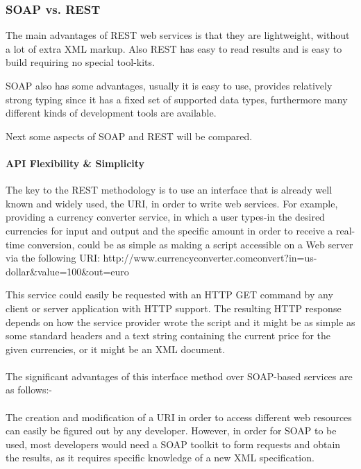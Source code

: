 \subsubsection{SOAP vs. REST\label{sec:back_soap_vs_rest}}

The main advantages of REST web services is that they are lightweight, without a lot of extra XML markup. Also REST has easy to read results and is easy to build requiring no special tool-kits.

SOAP also has some advantages, usually it is easy to use, provides relatively strong typing since it has a fixed set of supported data types, furthermore many different kinds of development tools are available.

Next some aspects of SOAP and REST will be compared.

\paragraph{API Flexibility \& Simplicity}

The key to the REST methodology is to use an interface that is already well known and widely used, the URI, in order to write web services. For example, providing a currency converter service, in which a user types-in the desired currencies for input and output and the specific amount in order to receive a real-time conversion, could be as simple as making a script accessible on a Web server via the following URI: http://www.currencyconverter.com\/convert?in=us-dollar\&value=100\&out=euro

This service could easily be requested with an HTTP GET command by any client or server application with HTTP support. The resulting HTTP response depends on how the service provider wrote the script and it might be as simple as some standard headers and a text string containing the current price for the given currencies, or it might be an XML document.
\\
\\
The significant advantages of this interface method over SOAP-based services are as follows:-
\\
\\
The creation and modification of a URI in order to access different web resources can easily be figured out by any developer. However, in order for SOAP to be used, most developers would need a SOAP toolkit to form requests and obtain the results, as it requires specific knowledge of a new XML specification.
\\
\\
